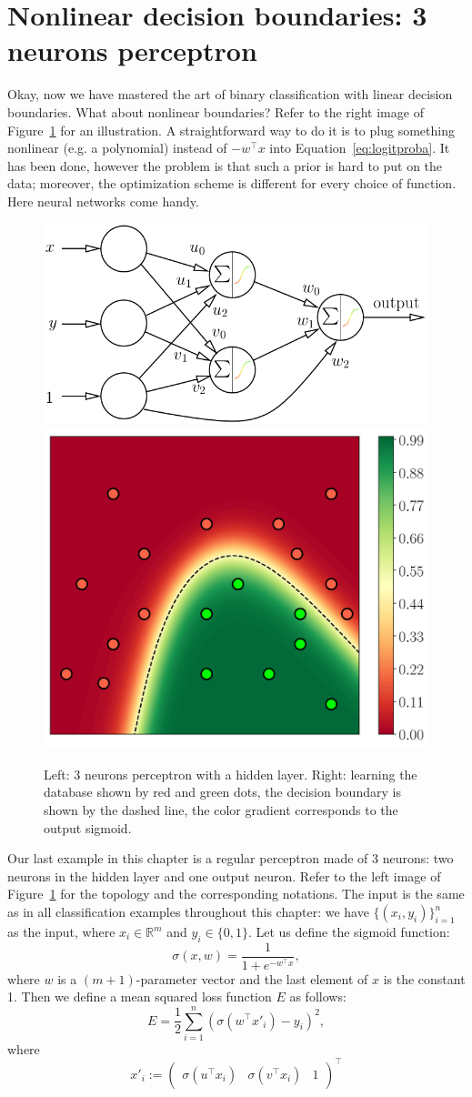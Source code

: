 \documentclass[notitlepage,oneside]{book}
\begin{document}
\section{Nonlinear decision boundaries: 3 neurons perceptron}
\label{sec:NN}
Okay, now we have mastered the art of binary classification with linear decision boundaries.
What about nonlinear boundaries? Refer to the right image of Figure~\ref{fig:neural} for an illustration.
A straightforward way to do it is to plug something nonlinear (e.g. a polynomial) instead of $-w^\top x$ into Equation~\eqref{eq:logitproba}.
It has been done, however the problem is that such a prior is hard to put on the data; moreover, the optimization scheme is different for every choice of function.
Here neural networks come handy.

\begin{figure}[t]
    \centering
    \includegraphics[width=.55\linewidth]{img/3neurons.png}
    \quad
    \includegraphics[width=.4\linewidth]{img/neural.png}
    \caption{Left: 3 neurons perceptron with a hidden layer. Right: learning the database shown by red and green dots, the decision boundary is shown by the dashed line, the color gradient corresponds to the output sigmoid.}
    \label{fig:neural}
\end{figure}

Our last example in this chapter is a regular perceptron made of 3 neurons: two neurons in the hidden layer and one output neuron.
Refer to the left image of Figure~\ref{fig:neural} for the topology and the corresponding notations.
The input is the same as in all classification examples throughout this chapter: we have $\{(x_i, y_i)\}_{i=1}^n$ as the input, where $x_i\in\mathbb R^m$ and $y_i\in \{0,1\}$.
Let us define the sigmoid function:
$$
\sigma(x,w) = \frac{1}{1+e^{-w^\top x}},
$$
where $w$ is a $(m+1)$-parameter vector and the last element of $x$ is the constant 1.
Then we define a mean squared loss function $E$ as follows:
$$
E = \frac{1}{2}\sum_{i=1}^{n} \left(\sigma\left(w^\top x'_i\right) - y_i\right)^2,
$$
where
$$
x'_i :=  \begin{pmatrix} \sigma(u^\top x_i) &  \sigma(v^\top x_i) & 1\end{pmatrix}^\top
$$
\end{document}
